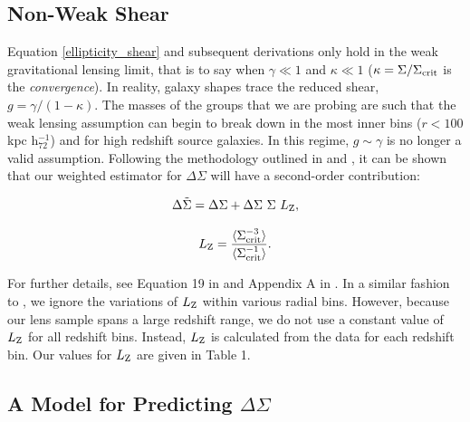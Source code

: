 \documentclass[12pt]{emulateapj}
\begin{document}
\subsection{Non-Weak Shear}\label{non_weak_shear}

Equation \ref{ellipticity_shear} and subsequent derivations only hold
in the weak gravitational lensing limit, that is to say when $\gamma
\ll 1$ and $\kappa \ll 1$ ($\kappa = \Sigma / \Sigma_{\rm crit}$ is
the {\em convergence}). In reality, galaxy shapes trace the reduced
shear, $g=\gamma/(1-\kappa)$. The masses of the groups that we are
probing are such that the weak lensing assumption can begin to break
down in the most inner bins ($r<100$kpc h$_{72}^{-1}$) and for high
redshift source galaxies. In this regime, $g \sim \gamma$ is no longer
a valid assumption. Following the methodology outlined in
\citet[][]{Johnston:2007} and \citet[][]{Mandelbaum:2006}, it can be
shown that our weighted estimator for $\Delta\Sigma$ will have a
second-order contribution:

\begin{equation}
\Delta \tilde\Sigma = \Delta\Sigma + \Delta\Sigma~\Sigma~L_{\rm Z},
\end{equation}

\begin{equation}
  L_{\rm Z} = \frac{\langle \Sigma_{\rm crit}^{-3}\rangle }{\langle \Sigma_{\rm crit}^{-1}\rangle}.
\end{equation}

For further details, see Equation 19 in \citet[][]{Johnston:2007} and
Appendix A in \citet[][]{Mandelbaum:2006}. In a similar fashion to
\citet[][]{Johnston:2007}, we ignore the variations of $L_{\rm Z}$
within various radial bins. However, because our lens sample spans a
large redshift range, we do not use a constant value of $L_{\rm Z}$
for all redshift bins. Instead, $L_{\rm Z}$ is calculated from the
data for each redshift bin. Our values for $L_{\rm Z}$ are given in
Table 1.

\subsection{A Model for Predicting $\Delta\Sigma$}\label{model_for_ds}
\end{document}
